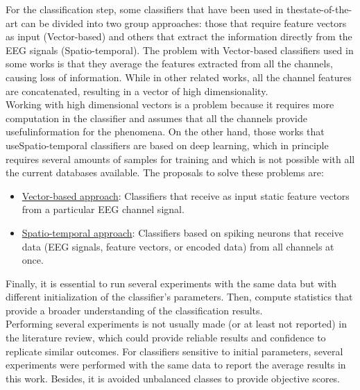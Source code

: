 For the classification step, some classifiers that have been used in the\linebreak[4] state-of-the-art can be divided into two group approaches: those that require feature vectors as input (Vector-based) and others that extract the information directly from the EEG signals (Spatio-temporal). The problem with Vector-based classifiers used in some works is that they average the features extracted from all the channels, causing loss of information. While in other related works, all the channel features are concatenated, resulting in a vector of high dimensionality.\\

Working with high dimensional vectors is a problem because it requires more computation in the classifier and assumes that all the channels provide useful\linebreak[4] information for the phenomena. On the other hand, those works that use\linebreak[4] Spatio-temporal classifiers are based on deep learning, which in principle requires several amounts of samples for training and which is not possible with all the current databases available. The proposals to solve these problems are:\\
\begin{itemize}
	\item \underline{Vector-based approach}: Classifiers that receive as input static feature vectors from a particular EEG channel signal.
	\item \underline{Spatio-temporal approach}: Classifiers based on spiking neurons that receive data (EEG signals, feature vectors, or encoded data) from all channels at once.
\end{itemize}

Finally, it is essential to run several experiments with the same data but with different initialization of the classifier's parameters. Then, compute statistics that provide a broader understanding of the classification results.\\

Performing several experiments is not usually made (or at least not reported) in the literature review, which could provide reliable results and confidence to replicate similar outcomes. For classifiers sensitive to initial parameters, several experiments were performed with the same data to report the average results in this work. Besides, it is avoided unbalanced classes to provide objective scores.

